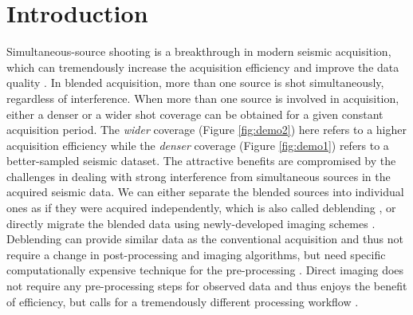 \section{Introduction}
Simultaneous-source shooting is a breakthrough in modern seismic acquisition, which can tremendously increase the acquisition efficiency and improve the data quality \cite[]{beasleycj1998,berkhout2008,abma2009}. In blended acquisition, more than one source is shot simultaneously, regardless of  interference. When more than one source is involved in acquisition, either a denser or a wider shot coverage can be obtained for a given constant acquisition period. The \emph{wider} coverage (Figure \ref{fig:demo2}) here refers to a higher acquisition efficiency while the \emph{denser} coverage (Figure \ref{fig:demo1}) refers to a better-sampled seismic dataset. The attractive benefits are compromised by the challenges in dealing with strong interference from simultaneous sources in the acquired seismic data. We can either separate the blended sources into individual ones as if they were acquired independently, which is also called deblending \cite[]{yangkang2014svmf,shuwei2016}, or directly migrate the blended data using  newly-developed imaging schemes \cite[]{verschuur2011,yaxun2009}. Deblending can provide similar data as the conventional acquisition and thus not require a change in post-processing and imaging algorithms, but need specific computationally expensive technique for the pre-processing \cite[]{abma2009,abma2014}. Direct imaging does not require any pre-processing steps for observed data and thus enjoys the benefit of  efficiency, but calls for a tremendously different processing workflow \cite[]{zhiguang2014,yangkang2015image}. 

